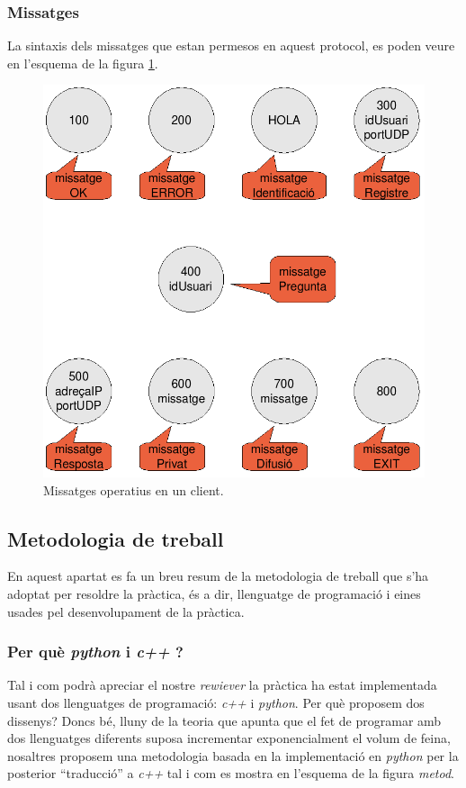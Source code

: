 \documentclass[a4paper,10pt]{article}
\begin{document}
		\subsubsection{Missatges}
		La sintaxis dels missatges que estan permesos en aquest protocol, es poden veure en l'esquema de la figura \ref{missatges}.

		        \begin{figure}[h]
			\begin{center}
			\includegraphics[scale=0.4]{messages.png}
			\caption{Missatges operatius en un client.}
			\label{missatges}
			\end{center}
			\end{figure}

	\subsection{Metodologia de treball}
	En aquest apartat es fa un breu resum de la metodologia de treball que s'ha adoptat per resoldre la pràctica, és a dir, llenguatge de programació i eines usades pel desenvolupament de la pràctica.

		\subsubsection{Per què \emph{python} i \emph{c++} ?}
		Tal i com podrà apreciar el nostre \emph{rewiever} la pràctica ha estat implementada usant dos llenguatges de programació: \emph{c++} i \emph{python}. Per què proposem dos dissenys? Doncs bé, lluny de la teoria que apunta que el fet de programar amb dos llenguatges diferents suposa incrementar exponencialment el volum de feina, nosaltres proposem una metodologia basada en la implementació en \emph{python} per la posterior ``traducció'' a \emph{c++} tal i com es mostra en l'esquema de la figura \emph{metod}.
\end{document}
